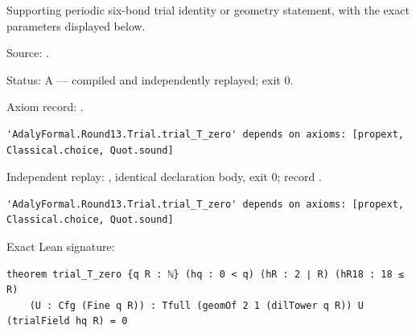 \begin{theorem}[bp-374]
\label{bp-374}
\leanok
Supporting periodic six-bond trial identity or geometry statement, with the exact parameters displayed below.

\par Source: \texttt{}.
\par Status: A — compiled and independently replayed; exit 0.
\par Axiom record: \texttt{}.
\begin{verbatim}
'AdalyFormal.Round13.Trial.trial_T_zero' depends on axioms: [propext, Classical.choice, Quot.sound]
\end{verbatim}
\par Independent replay: \texttt{}, identical declaration body, exit 0; record \texttt{}.
\begin{verbatim}
'AdalyFormal.Round13.Trial.trial_T_zero' depends on axioms: [propext, Classical.choice, Quot.sound]
\end{verbatim}
\par Exact Lean signature:
\begin{verbatim}
theorem trial_T_zero {q R : ℕ} (hq : 0 < q) (hR : 2 ∣ R) (hR18 : 18 ≤ R)
    (U : Cfg (Fine q R)) : Tfull (geomOf 2 1 (dilTower q R)) U (trialField hq R) = 0
\end{verbatim}
\end{theorem}

